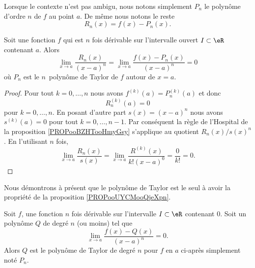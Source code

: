 \begin{normaltext}
    Lorsque le contexte n'est pas ambigu, nous notons simplement \( P_n\) le polynôme d'ordre \( n\) de \( f\) au point \( a\). De même nous notons le reste
    \begin{equation}
        R_n(x)=f(x)-P_n(x).
    \end{equation}
\end{normaltext}

\begin{proposition}      \label{PROPooUYCMooQjeXpn}
    Soit une fonction \( f\) qui est \( n\) fois dérivable sur l'intervalle ouvert \( I\subset \eR\) contenant \( a\). Alors
    \begin{equation}
        \lim_{x\to a} \frac{ R_n(x) }{ (x-a)^n }=\lim_{x\to a} \frac{ f(x)-P_n(x) }{ (x-a)^n }=0
    \end{equation}
    où \( P_n\) est le \( n\)\ieme\ polynôme de Taylor de \( f\) autour de \( x=a\).
\end{proposition}

\begin{proof}
    Pour tout \( k=0,\ldots, n\) nous avons \( f^{(k)}(a)=P_n^{(k)}(a)\) et donc
    \begin{equation}
        R_n^{(k)}(a)=0
    \end{equation}
    pour \( k=0,\ldots, n\). En posant d'autre part \( s(x)=(x-a)^n\) nous avons \( s^{(k)}(a)=0\) pour tout \( k=0,\ldots, n-1\). Par conséquent la règle de l'Hospital de la proposition \ref{PROPooBZHTooHmyGsy} s'applique au quotient \( R_n(x)/s(x)^n\). En l'utilisant \( n\) fois,
    \begin{equation}
        \lim_{x\to a} \frac{ R_n(x) }{ s(x) }=\lim_{x\to a} \frac{ R^{(k)}(x) }{ k!(x-a)^0 }=\frac{ 0 }{ k! }=0.
    \end{equation}
\end{proof}

Nous démontrons à présent que le polynôme de Taylor est le seul à avoir la propriété de la proposition \ref{PROPooUYCMooQjeXpn}.
\begin{proposition}
    Soit \( f\), une fonction \( n\) fois dérivable sur l'intervalle \( I\subset \eR\) contenant \( 0\). Soit un polynôme \( Q\) de degré \( n\) (ou moins) tel que
    \begin{equation}    \label{EQooXPTIooOZqBaD}
        \lim_{x\to a} \frac{ f(x)-Q(x) }{ (x-a)^n  }=0.
    \end{equation}
    Alors \( Q\) est le polynôme de Taylor de degré \( n\) pour \( f\) en \( a\) ci-après simplement noté \( P_n\).
\end{proposition}

